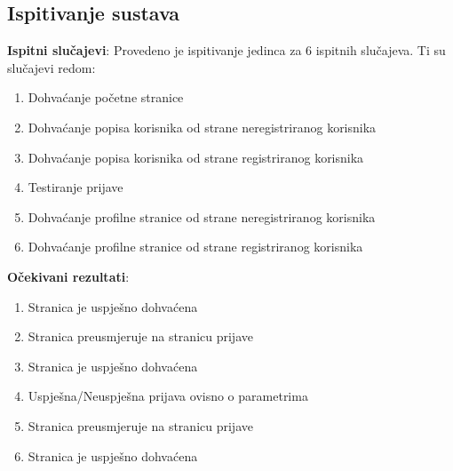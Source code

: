 			\subsection{Ispitivanje sustava}
			\textbf{Ispitni slučajevi}: \newline
			Provedeno je ispitivanje jedinca za 6 ispitnih slučajeva. Ti su slučajevi redom:
			\begin{enumerate}
				\item Dohvaćanje početne stranice
				\item Dohvaćanje popisa korisnika od strane neregistriranog korisnika
				\item Dohvaćanje popisa korisnika od strane registriranog korisnika
				\item Testiranje prijave
				\item Dohvaćanje profilne stranice od strane neregistriranog korisnika
				\item Dohvaćanje profilne stranice od strane registriranog korisnika
			\end{enumerate}
			
			\noindent  \textbf{Očekivani rezultati}: 
			\begin{enumerate}
				\item Stranica je uspješno dohvaćena
				\item Stranica preusmjeruje na stranicu prijave
				\item Stranica je uspješno dohvaćena
				\item Uspješna/Neuspješna prijava ovisno o parametrima
				\item Stranica preusmjeruje na stranicu prijave
				\item Stranica je uspješno dohvaćena
			\end{enumerate}
			
